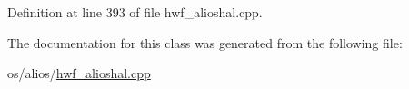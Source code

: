 Definition at line 393 of file hwf\+\_\+alioshal.\+cpp.


\begin{DoxyCode}{0}
\end{DoxyCode}


The documentation for this class was generated from the following file\+:\begin{DoxyCompactItemize}
\item 
os/alios/\mbox{\hyperlink{hwf__alioshal_8cpp}{hwf\+\_\+alioshal.\+cpp}}\end{DoxyCompactItemize}
